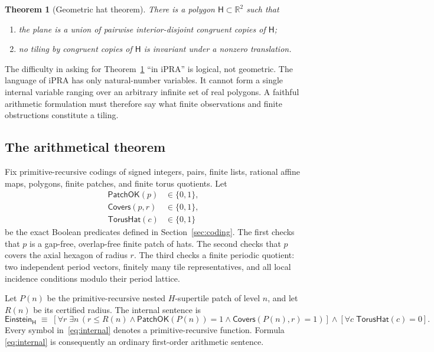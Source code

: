 \documentclass[11pt]{article}
\newtheorem{theorem}{Theorem}[section]
\newcommand{\iPRA}{\mathrm{iPRA}}
\newcommand{\Htile}{\mathsf H}
\begin{document}
\begin{theorem}[Geometric hat theorem]\label{thm:geometric}
There is a polygon $\Htile\subset\mathbb R^2$ such that
\begin{enumerate}[label=(\roman*)]
\item the plane is a union of pairwise interior-disjoint congruent copies of $\Htile$;
\item no tiling by congruent copies of $\Htile$ is invariant under a nonzero translation.
\end{enumerate}
\end{theorem}

The difficulty in asking for Theorem~\ref{thm:geometric} ``in $\iPRA$'' is logical, not
geometric.  The language of $\iPRA$ has only natural-number variables.  It cannot form a
single internal variable ranging over an arbitrary infinite set of real polygons.  A
faithful arithmetic formulation must therefore say what finite observations and finite
obstructions constitute a tiling.

\subsection{The arithmetical theorem}
Fix primitive-recursive codings of signed integers, pairs, finite lists, rational affine
maps, polygons, finite patches, and finite torus quotients.  Let
\begin{align*}
 \mathsf{PatchOK}(p)&\in\{0,1\},\\
 \mathsf{Covers}(p,r)&\in\{0,1\},\\
 \mathsf{TorusHat}(c)&\in\{0,1\}
\end{align*}
be the exact Boolean predicates defined in Section~\ref{sec:coding}.  The first checks
that $p$ is a gap-free, overlap-free finite patch of hats.  The second checks that $p$
covers the axial hexagon of radius $r$.  The third checks a finite periodic quotient:
two independent period vectors, finitely many tile representatives, and all local
incidence conditions modulo their period lattice.

Let $P(n)$ be the primitive-recursive nested $H$-supertile patch of level $n$, and let
$R(n)$ be its certified radius.  The internal sentence is
\begin{equation}\label{eq:internal}
\mathsf{Einstein}_{\Htile}\;\equiv\;
\left[\forall r\;\exists n\,
   (r\le R(n)\wedge \mathsf{PatchOK}(P(n))=1
       \wedge \mathsf{Covers}(P(n),r)=1)\right]
\wedge
\left[\forall c\;\mathsf{TorusHat}(c)=0\right].
\end{equation}
Every symbol in~\eqref{eq:internal} denotes a primitive-recursive function.  Formula
\eqref{eq:internal} is consequently an ordinary first-order arithmetic sentence.
\end{document}
